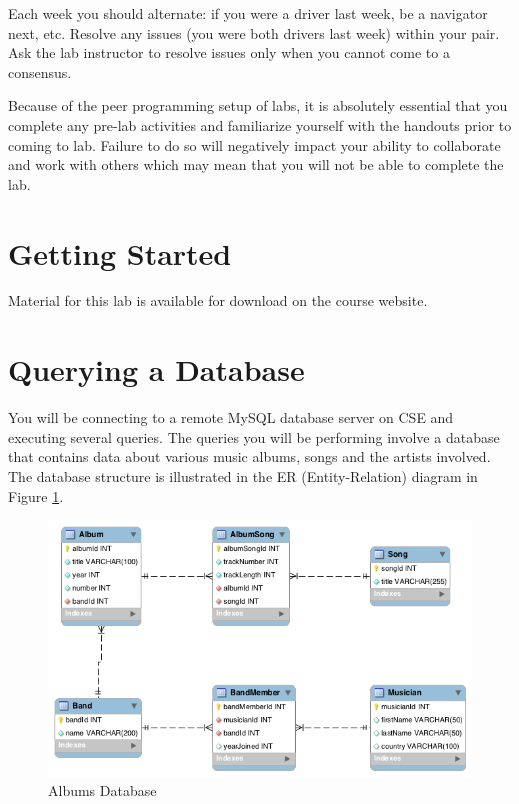 \documentclass[12pt]{scrartcl}
\begin{document}
Each week you should alternate: if you were a driver last week, 
be a navigator next, etc.  Resolve any issues (you were both drivers
last week) within your pair.  Ask the lab instructor to resolve issues
only when you cannot come to a consensus.  

Because of the peer programming setup of labs, it is absolutely 
essential that you complete any pre-lab activities and familiarize
yourself with the handouts prior to coming to lab.  Failure to do
so will negatively impact your ability to collaborate and work with 
others which may mean that you will not be able to complete the
lab.  

\section*{Getting Started}

Material for this lab is available for download on the course website.

\section*{Querying a Database}

You will be connecting to a remote MySQL database server on CSE 
and executing several queries.  The queries you will be performing 
involve a database that contains data about various music albums, songs
and the artists involved.  The database structure is illustrated 
in the ER (Entity-Relation) diagram in Figure \ref{figure:albumDB}.

\begin{figure}[h]
\centering
\includegraphics[scale=.650]{sql/albums}
\caption{Albums Database}
\label{figure:albumDB}
\end{figure}
\end{document}

